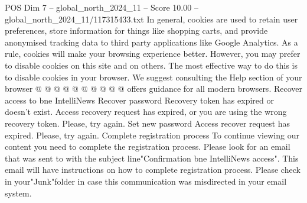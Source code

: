 \begin{textsample}{POS Dim 7 – global\_north\_2024\_11 – Score 10.00 – global\_north\_2024\_11/117315433.txt}
In general, cookies are used to retain user preferences, store information for things like shopping carts, and provide anonymised tracking data to third party applications like Google Analytics.
As a rule, cookies will make your browsing experience better.
However, you may prefer to disable cookies on this site and on others.
The most effective way to do this is to disable cookies in your browser.
We suggest consulting the Help section of your browser @ @ @ @ @ @ @ @ @ @ offers guidance for all modern browsers.
Recover access to bne IntelliNews Recover password Recovery token has expired or doesn't exist.
Access recovery request has expired, or you are using the wrong recovery token.
Please, try again.
Set new password Access recover request has expired.
Please, try again.
Complete registration process To continue viewing our content you need to complete the registration process.
Please look for an email that was sent to with the subject line"Confirmation bne IntelliNews access".
This email will have instructions on how to complete registration process.
Please check in your"Junk"folder in case this communication was misdirected in your email system.

\end{textsample}
